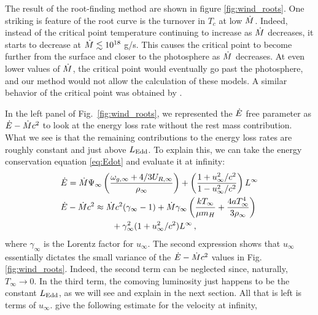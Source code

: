 \documentclass[../main.tex]{subfiles}
\begin{document}
The result of the root-finding method are shown in figure \ref{fig:wind_roots}. One striking is feature of the root curve is the turnover in $T_c$ at low $\dot{M}$. Indeed, instead of the critical point temperature continuing to increase as $\dot{M}$ decreases, it starts to decrease at $\dot{M}\lesssim 10^{18}$ g/s. This causes the critical point to become further from the surface and closer to the photosphere as $\dot{M}$ decreases. At even lower values of $\dot{M}$, the critical point would eventually go past the photosphere, and our method would not allow the calculation of these models. A similar behavior of the critical point was obtained by \citet{Paczynski1986b}. 

In the left panel of Fig.~\ref{fig:wind_roots}, we represented the $\dot{E}$ free parameter as $\dot{E}-\dot{M} c^2$ to look at the energy loss rate without the rest mass contribution. What we see is that the remaining contributions to the energy loss rates are roughly constant and just above $L_\text{Edd}$. To explain this, we can take the energy conservation equation \eqref{eq:Edot} and evaluate it at infinity:
\begin{align}\label{eq:Edot_at_infty_approx}
    &\dot{E}=\dot{M}\Psi_\infty \left(\frac{\omega_{g,\infty}+4/3U_{R,\infty}}{\rho_\infty}\right)+\left(\frac{1+u_\infty^2/c^2}{1-u_\infty^2/c^2}\right)L^\infty\nonumber\\
    &\dot{E}-\dot{M} c^2\approx \dot{M} c^2(\gamma_\infty-1) + \dot{M}\gamma_\infty\left(\frac{kT_\infty}{\mu m_H}+\frac{4aT_\infty^4}{3\rho_\infty}\right)\nonumber\\
    &\qquad\qquad\qquad+\gamma_\infty^2(1+u_\infty^2/c^2)L^\infty\,,
\end{align}
where $\gamma_\infty$ is the Lorentz factor for $u_\infty$. The second expression shows that $u_\infty$ essentially dictates the small variance of the $\dot{E}-\dot{M} c^2$ values in Fig.\ref{fig:wind_roots}. Indeed, the second term can be neglected since, naturally, $T_\infty\rightarrow0$. In the third term, the comoving luminosity just happens to be the constant $L_\text{Edd}$, as we will see and explain in the next section. All that is left is terms of $u_\infty$. \citet{Paczynski1986b} give the following estimate for the velocity at infinity,
\end{document}
